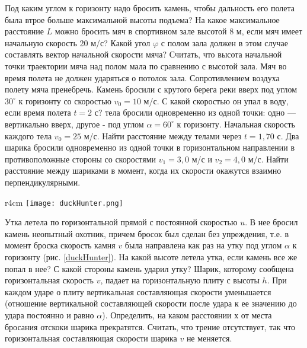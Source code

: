 \AddProb Под каким углом к горизонту надо бросить камень, чтобы дальность его полета была втрое больше максимальной высоты подъема?
\AddProb На какое максимальное расстояние $L$ можно бросить мяч в спортивном зале высотой 8 м, если мяч имеет начальную скорость 20 м/с? Какой угол $\varphi$ с полом зала должен в этом случае составлять вектор начальной скорости мяча? Считать, что высота начальной точки траектории мяча над полом мала по сравнению с высотой зала. Мяч во время полета не должен ударяться о потолок зала. Сопротивлением воздуха полету мяча пренебречь.
\AddProb Камень бросили с крутого берега реки вверх под углом $30^{\circ}$ к горизонту со скоростью $v_0 = 10$ м/с. С какой скоростью он упал в воду, если время полета $t = 2$ с?
 тела бросили одновременно из одной точки: одно — вертикально вверх, другое - под углом $\alpha = 60^{\circ}$ к горизонту. Начальная скорость каждого тела $v_0 = 25$ м/с. Найти расстояние между телами через $t = 1,70$ с.
\AddProb Два шарика бросили одновременно из одной точки в горизонтальном направлении в противоположные стороны со скоростями $v_1 = 3,0$ м/с и $v_2 = 4,0$ м/с. Найти расстояние между шариками в момент, когда их скорости окажутся взаимно перпендикулярными.

\begin{wrapfigure}[7]{r}{4cm}
\texttt{[image: duckHunter.png]}
\caption{}
\label{duckHunter}
\end{wrapfigure}
\AddProb Утка летела по горизонтальной прямой с постоянной скоростью $u$. В нее бросил камень неопытный охотник, причем бросок был сделан без упреждения, т.е. в момент броска скорость камня $v$ была направлена как раз на утку под углом $\alpha$ к горизонту (рис. \ref{duckHunter}). На какой высоте летела утка, если камень все же попал в нее? С какой стороны камень ударил утку?
\AddProb Шарик, которому сообщена горизонтальная скорость $v$, падает на горизонтальную плиту с высоты $h$. При каждом ударе о плиту вертикальная составляющая скорости уменьшается (отношение вертикальной составляющей скорости после удара к ее значению до удара
постоянно и равно $\alpha$). Определить, на каком расстоянии $х$ от места бросания отскоки шарика прекратятся. Считать, что трение отсутствует, так что горизонтальная составляющая скорости шарика $v$ не меняется.
\clearpage